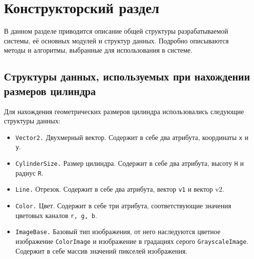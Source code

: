 \chapter{Конструкторский раздел}
В данном разделе приводится описание общей структуры разрабатываемой системы, её основных модулей и структур данных. Подробно описываются методы и алгоритмы, выбранные для использования в системе.
\section{Структуры данных, используемых при нахождении размеров цилиндра}
Для нахождения геометрических размеров цилиндра использовались следующие структуры данных:

\begin{itemize}
	\item \texttt{Vector2.}
	Двухмерный вектор. Содержит в себе два атрибута, координаты \texttt{x} и \texttt{y}.
	
	\item \texttt{CylinderSize.}
	Размер цилиндра. Содержит в себе два атрибута, высоту \texttt{H} и радиус \texttt{R}.
	
	\item \texttt{Line.}
	Отрезок. Содержит в себе два атрибута, вектор \texttt{v1} и вектор v2.
	
	\item \texttt{Color.}
	Цвет. Содержит в себе три атрибута, соответствующие значения цветовых каналов \texttt{r, g, b}.
	
	\item \texttt{ImageBase.} 
	Базовый тип изображения, от него наследуются цветное изображение \texttt{ColorImage} и изображение в градациях серого \texttt{GrayscaleImage}.
	Содержит в себе массив значений пикселей изображения.
\end{itemize}
%

